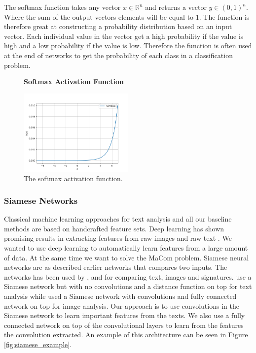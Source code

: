 The softmax function takes any vector $x \in \mathbb{R}^n$ and returns a vector
$y \in (0, 1)^n$. Where the sum of the output vectors elements will be equal to
1. The function is therefore great at constructing a probability distribution
based on an input vector. Each individual value in the vector get a high
probability if the value is high and a low probability if the value is low.
Therefore the function is often used at the end of networks to get the
probability of each class in a classification problem.

\begin{figure}
    \centering
    \textbf{Softmax Activation Function}\par\medskip
    \includegraphics[width=0.5\textwidth]{./pictures/method/softmax_function.png}
    \caption{The softmax activation function.}
    \label{fig:softmax_activation}
\end{figure}

\subsubsection{Siamese Networks}

Classical machine learning approaches for text analysis and all our baseline
methods are based on handcrafted feature sets. Deep learning has shown
promising results in extracting features from raw images and raw text
\cite{hongxiaosunyuan}. We wanted to use deep learning to automatically learn
features from a large amount of data. At the same time we want to solve the
MaCom problem. Siamese neural networks are as described earlier networks that
compares two inputs. The networks has been used by \cite{Koch2015SiameseNN},
\cite{NIPS1993_769} and \cite{qian:2018} for comparing text, images and
signatures. \cite{qian:2018} use a Siamese network but with no convolutions and
a distance function on top for text analysis while \cite{Koch2015SiameseNN}
used a Siamese network with convolutions and fully connected network on top for
image analysis. Our approach is to use convolutions in the Siamese network to
learn important features from the texts. We also use a fully connected network
on top of the convolutional layers to learn from the features the convolution
extracted. An example of this architecture can be seen in Figure
\ref{fig:siamese_example}.

